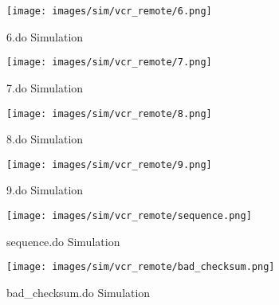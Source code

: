 \documentclass[a4paper]{article}
\makeatletter
\newcommand{\filecaption}[1]{\filename@parse{#1}\filename@base.\filename@ext}
\newcommand{\filelisting}[2][]{%
}
\makeatother
\begin{document}
\filelisting[float]{../do_files/vcr_remote/6.do}
\begin{figure}[H]
	\centering
	\texttt{[image: images/sim/vcr\_remote/6.png]}
	\caption{6.do Simulation}
\end{figure}

\filelisting[float]{../do_files/vcr_remote/7.do}
\begin{figure}[H]
	\centering
	\texttt{[image: images/sim/vcr\_remote/7.png]}
	\caption{7.do Simulation}
\end{figure}

\filelisting[float]{../do_files/vcr_remote/8.do}
\begin{figure}[H]
	\centering
	\texttt{[image: images/sim/vcr\_remote/8.png]}
	\caption{8.do Simulation}
\end{figure}

\filelisting[float]{../do_files/vcr_remote/9.do}
\begin{figure}[H]
	\centering
	\texttt{[image: images/sim/vcr\_remote/9.png]}
	\caption{9.do Simulation}
\end{figure}

\filelisting[float]{../do_files/vcr_remote/sequence.do}
\begin{figure}[H]
	\centering
	\texttt{[image: images/sim/vcr\_remote/sequence.png]}
	\caption{sequence.do Simulation}
\end{figure}

\filelisting[float]{../do_files/vcr_remote/bad_checksum.do}
\begin{figure}[H]
	\centering
	\texttt{[image: images/sim/vcr\_remote/bad\_checksum.png]}
	\caption{bad\_checksum.do Simulation}
\end{figure}

\printbibliography
\end{document}
